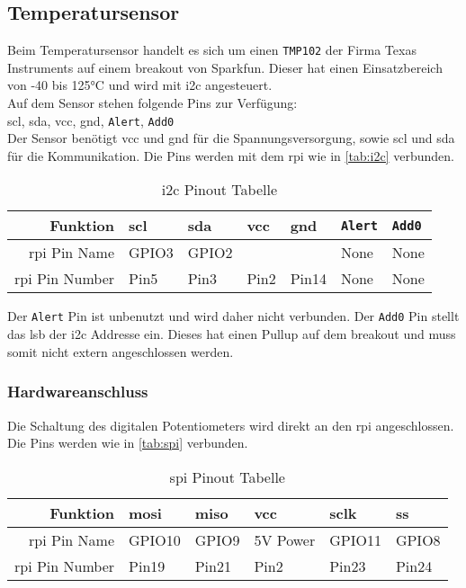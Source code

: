 \subsection{Temperatursensor}
Beim Temperatursensor handelt es sich um einen \texttt{TMP102} der Firma Texas Instruments auf einem \gls{breakout} von Sparkfun.
Dieser hat einen Einsatzbereich von -40 bis 125°C und wird mit \gls{i2c} angesteuert. \\
Auf dem Sensor stehen folgende Pins zur Verfügung: \\
\gls{scl}, \gls{sda}, \gls{vcc}, \gls{gnd}, \texttt{Alert}, \texttt{Add0} \\

Der Sensor benötigt \gls{vcc} und \gls{gnd} für die Spannungsversorgung, sowie \gls{scl} und \gls{sda} für die Kommunikation.
Die Pins werden mit dem \gls{rpi} wie in \autoref{tab:i2c} verbunden.

\begin{table}[h]
    \centering
    \begin{tabular}{|r||l|l|l|l|l|l|}
        \hline
        \textbf{Funktion} & \textbf{\gls{scl}} & \textbf{\gls{sda}} & \textbf{\gls{vcc}} & \textbf{\gls{gnd}} & \textbf{\texttt{Alert}} & \textbf{\texttt{Add0}}\\
        \hline
        \hline
        \gls{rpi} Pin Name & GPIO3 & GPIO2 & & & None & None \\
        \hline
        \gls{rpi} Pin Number & Pin5 & Pin3 & Pin2 & Pin14 & None & None \\
        \hline
    \end{tabular}
    \caption{\gls{i2c} Pinout Tabelle}
    \label{tab:i2c}
\end{table}

Der \texttt{Alert} Pin ist unbenutzt und wird daher nicht verbunden.
Der \texttt{Add0} Pin stellt das \gls{lsb} der \gls{i2c} Addresse ein.
Dieses hat einen Pullup auf dem \gls{breakout} und muss somit nicht extern angeschlossen werden.

\subsubsection{Hardwareanschluss}
Die Schaltung des digitalen Potentiometers wird direkt an den \gls{rpi} angeschlossen. \\
Die Pins werden wie in \autoref{tab:spi} verbunden.
\begin{table}[h]
    \centering
    \begin{tabular}{|r||l|l|l|l|l|}
        \hline
        \textbf{Funktion} & \textbf{\acrshort{mosi}} & \textbf{\acrshort{miso}} & \textbf{\acrshort{vcc}} & \textbf{\acrshort{sclk}} & \textbf{\acrshort{ss}} \\
        \hline
        \hline
        \gls{rpi} Pin Name & GPIO10 & GPIO9 & 5V Power & GPIO11 & GPIO8 \\
        \hline
        \gls{rpi} Pin Number & Pin19 & Pin21 & Pin2 & Pin23 & Pin24 \\
        \hline
    \end{tabular}
    \caption{\gls{spi} Pinout Tabelle}
    \label{tab:spi}
\end{table}

